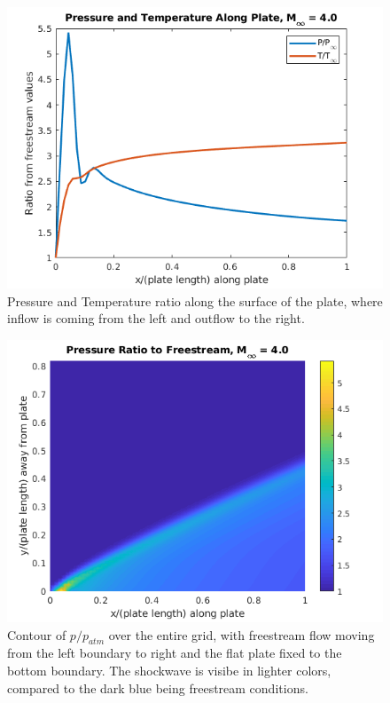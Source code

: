 \documentclass[10pt,a4paper]{article}
\begin{document}
\begin{figure}[!htb]
	\begin{center}
		\includegraphics[scale=0.7]{images/UpperFlatPlate_PresTemp.png} 
		\caption{Pressure and Temperature ratio along the surface of the plate, where inflow is coming from the left and outflow to the right.}
		\label{fig:UpperFlatPlate_PresTemp}
	\end{center}
\end{figure}

\begin{figure}[!htb]
	\begin{center}
		\includegraphics[scale=0.7]{images/UpperFlatPlate_PresMap.png} 
		\caption{Contour of $p/p_{atm}$ over the entire grid, with freestream flow moving from the left boundary to right and the flat plate fixed to the bottom boundary. The shockwave is visibe in lighter colors, compared to the dark blue being freestream conditions.}
		\label{fig:UpperFlatPlate_PresMap}
	\end{center}
\end{figure}
\end{document}
